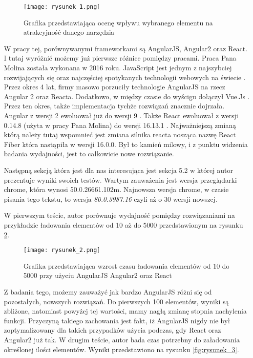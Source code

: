 \begin{figure}[!ht]
    \centering
    \texttt{[image: rysunek\_1.png]}
    \caption{Grafika przedstawiająca ocenę wpływu wybranego elementu na atrakcyjność danego narzędzia \cite{Molin}}
    \label{fig:rysunek_1}
\end{figure}

W pracy tej, porównywanymi frameworkami są AngularJS, Angular2 oraz React.
I tutaj wyróżnić możemy już pierwsze różnice pomiędzy pracami. Praca Pana Molina została wykonana w 2016 roku.
JavaScript jest jednym z najszybciej rozwijających  się oraz najczęściej spotykanych technologii webowych na świecie \cite{octoverse}.
Przez okres 4 lat, firmy masowo porzuciły technologie AngularJS na rzecz Angular 2 oraz Reacta.
Dodatkowo, w między czasie do wyścigu dołączył Vue.Js \cite{vue}.
Przez ten okres, także implementacja tychże rozwiązań znacznie dojrzała.
Angular z wersji 2 ewoluował już do wersji 9 \cite{angular-changelog}.
Także React ewoluował z wersji 0.14.8 (użyta w pracy  Pana Molina) do wersji 16.13.1 \cite{react-changelog}.
Najważniejszą zmianą którą należy tutaj wspomnieć jest zmiana silnika reacta nosząca nazwę React Fiber która nastąpiła w wersji 16.0.0.
Był to kamień milowy, i z punktu widzenia badania wydajności, jest to całkowicie nowe rozwiązanie. 

Następną sekcją która jest dla nas interesująca jest sekcja 5.2 w której autor prezentuje wyniki swoich testów.
Wartym zauważenia jest wersja przeglądarki chrome, która wynosi 50.0.26661.102m.
Najnowsza wersja chrome, w czasie pisania tego tekstu, to wersja \textit{80.0.3987.16} czyli aż o 30 wersji nowszej. 

W pierwszym teście, autor porównuje wydajność pomiędzy rozwiązaniami na przykładzie ładowania elementów od 10 aż do 5000 przedstawionym na rysunku \ref{fig:rysunek_2}.

\begin{figure}[!ht]
    \centering
    \texttt{[image: rysunek\_2.png]}
    \caption{Grafika przedstawiająca wzrost czasu ładowania elementów od 10 do 5000 przy użyciu AngularJS Angular2 oraz React \cite{Molin}}
    \label{fig:rysunek_2}
\end{figure}

Z badania tego, możemy zauważyć jak bardzo AngularJS różni się od pozostałych, nowszych rozwiązań. Do pierwszych 100 elementów, wyniki są zbliżone, natomiast powyżej tej wartości, mamy nagłą zmianę stopnia nachylenia funkcji. Przyczyną takiego zachowania jest fakt, iż AngularJS nigdy nie był zoptymalizowany dla takich przypadków użycia podczas, gdy React oraz Angular2 już tak.
W drugim teście, autor bada czas potrzebny do załadowania określonej ilości elementów. Wyniki przedstawiono na rysunku \ref{fig:rysunek_3}.

